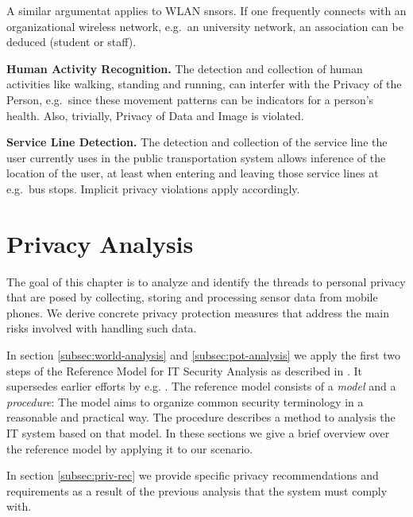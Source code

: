 \documentclass[runningheads,a4paper]{llncs}
\newenvironment{LGContent-Hidden}{ \comment  }{ }
\begin{document}
\begin{LGContent-Hidden}
A similar argumentat applies to WLAN snsors. If one frequently connects with an organizational wireless network, e.g.~an university network, an association can be deduced (student or staff).

\textbf{Human Activity Recognition.}
The detection and collection of human activities like walking, standing and running, can interfer with the Privacy of the Person, e.g.~since these movement patterns can be indicators for a person's health. Also, trivially, Privacy of Data and Image is violated.

\textbf{Service Line Detection.}
The detection and collection of the service line the user currently uses in the public transportation system allows inference of the location of the user, at least when entering and leaving those service lines at e.g.~bus stops.
Implicit privacy violations apply accordingly.

\end{LGContent-Hidden}









\section{Privacy Analysis}


The goal of this chapter is to analyze and identify the threads to
personal privacy that are posed by collecting, storing and processing
sensor data from mobile phones.  We derive concrete privacy protection
measures that address the main risks involved with handling such data.


In section \ref{subsec:world-analysis} and \ref{subsec:pot-analysis} we apply the first two steps of the Reference Model for IT Security Analysis as described in \cite{Grimm:ItSecRefModel}.  It supersedes earlier efforts by
e.g. \cite{Avizienis}.  The reference model consists of a \emph{model}
and a \emph{procedure}: The model aims to organize common security terminology in a reasonable and practical way. The procedure describes a method to analysis the IT system based on that model. In these sections we give a brief overview over the reference model by applying it to our scenario.


In section \ref{subsec:priv-rec} we provide specific privacy recommendations and requirements as a result of the previous analysis that the system must comply with.
\end{document}
